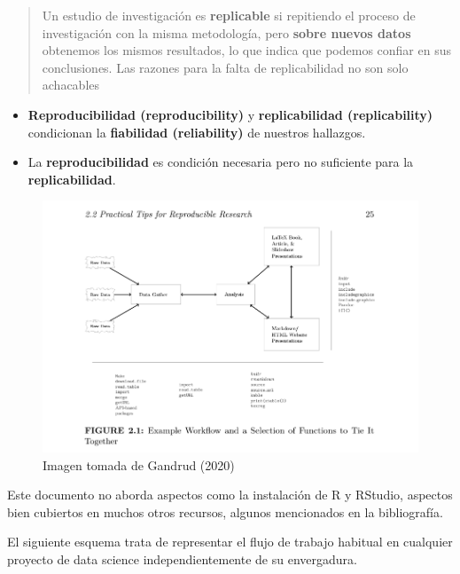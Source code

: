 \documentclass[
  letterpaper,
  DIV=11,
  numbers=noendperiod]{scrreprt}
\providecommand{\tightlist}{%
  \setlength{\itemsep}{0pt}\setlength{\parskip}{0pt}}\usepackage{longtable,booktabs,array}
\begin{document}
\begin{quote}
Un estudio de investigación es \textbf{replicable} si repitiendo el
proceso de investigación con la misma metodología, pero \textbf{sobre
nuevos datos} obtenemos los mismos resultados, lo que indica que podemos
confiar en sus conclusiones. Las razones para la falta de replicabilidad
no son solo achacables
\end{quote}

\begin{itemize}
\tightlist
\item
  \textbf{Reproducibilidad (reproducibility)} y \textbf{replicabilidad
  (replicability)} condicionan la \textbf{fiabilidad (reliability)} de
  nuestros hallazgos.
\item
  La \textbf{reproducibilidad} es condición necesaria pero no suficiente
  para la \textbf{replicabilidad}.
\end{itemize}

\begin{figure}

{\centering \includegraphics{./pics/tips_repro_res_gandrupbook.png}

}

\caption{Imagen tomada de Gandrud (2020)}

\end{figure}

Este documento no aborda aspectos como la instalación de R y RStudio,
aspectos bien cubiertos en muchos otros recursos, algunos mencionados en
la bibliografía.

El siguiente esquema trata de representar el flujo de trabajo habitual
en cualquier proyecto de data science independientemente de su
envergadura.
\end{document}
